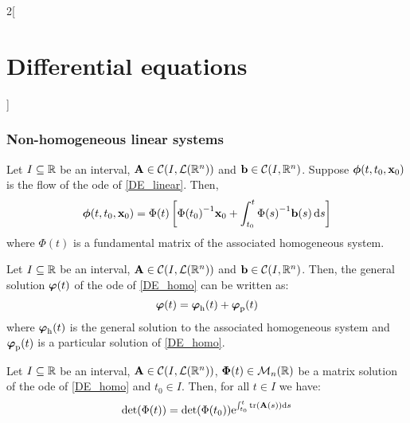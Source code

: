 \documentclass[../../../main_math.tex]{subfiles}
\begin{document}
\begin{multicols}{2}[\section{Differential equations}]
  \subsubsection{Non-homogeneous linear systems}
  \begin{proposition}
    Let $I\subseteq \mathbb{R}$ be an interval, $\boldsymbol{\mathrm{A}}\in\mathcal{C}(I,\mathcal{L}(\mathbb{R}^n))$ and $\boldsymbol{\mathrm{b}}\in\mathcal{C}(I,\mathbb{R}^n)$. Suppose $\boldsymbol{\mathrm{\phi}}(t,t_0,\boldsymbol{\mathrm{x}}_0)$ is the flow of the ode of \cref{DE_linear}. Then, $$\boldsymbol{\mathrm{\phi}}(t,t_0,\boldsymbol{\mathrm{x}}_0)=\Phi(t)\left[{\Phi(t_0)}^{-1}\boldsymbol{\mathrm{x}}_0+\int_{t_0}^t{\Phi(s)}^{-1}\boldsymbol{\mathrm{b}}(s)\dd{s}\right]$$ where $\Phi(t)$ is a fundamental matrix of the associated homogeneous system.
  \end{proposition}
  \begin{corollary}
    Let $I\subseteq \mathbb{R}$ be an interval, $\boldsymbol{\mathrm{A}}\in\mathcal{C}(I,\mathcal{L}(\mathbb{R}^n))$ and $\boldsymbol{\mathrm{b}}\in\mathcal{C}(I,\mathbb{R}^n)$. Then, the general solution $\boldsymbol{\mathrm{\varphi}}(t)$ of the ode of \cref{DE_homo} can be written as: $$\boldsymbol{\mathrm{\varphi}}(t)=\boldsymbol{\mathrm{\varphi}}_\mathrm{h}(t)+\boldsymbol{\mathrm{\varphi}}_\mathrm{p}(t)$$ where $\boldsymbol{\mathrm{\varphi}}_\mathrm{h}(t)$ is the general solution to the associated homogeneous system and $\boldsymbol{\mathrm{\varphi}}_\mathrm{p}(t)$ is a particular solution of \cref{DE_homo}.
  \end{corollary}
  \begin{proposition}
    Let $I\subseteq \mathbb{R}$ be an interval, $\boldsymbol{\mathrm{A}}\in\mathcal{C}(I,\mathcal{L}(\mathbb{R}^n))$, $\boldsymbol{\mathrm{\Phi}}(t)\in\mathcal{M}_n(\mathbb{R})$ be a matrix solution of the ode of \cref{DE_homo} and $t_0\in I$. Then, for all $t\in I$ we have: $$\det(\Phi(t))=\det (\Phi(t_0))\exp{\int_{t_0}^t\trace(\vf{A}(s))\dd{s}}$$
  \end{proposition}

\end{multicols}
\end{document}
